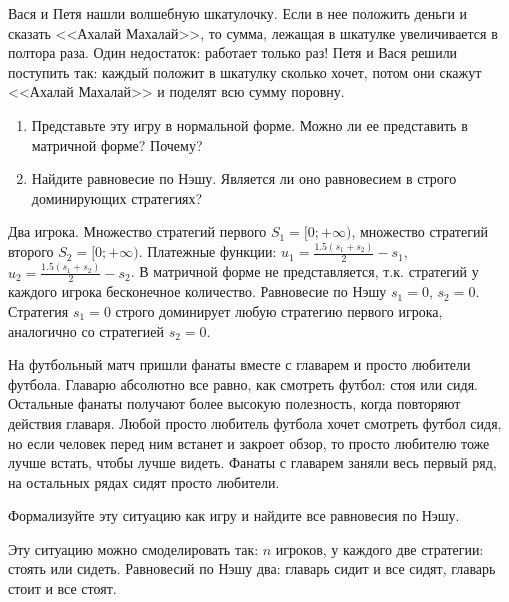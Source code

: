 \begin{problem}
Вася и Петя нашли волшебную шкатулочку. Если в нее положить деньги и сказать <<Ахалай Махалай>>, то сумма, лежащая в шкатулке увеличивается в полтора раза. Один недостаток: работает только раз! Петя и Вася решили поступить так: каждый положит в шкатулку сколько хочет, потом они скажут <<Ахалай Махалай>> и поделят всю сумму поровну.\par
\begin{enumerate}
\item 	Представьте эту игру в нормальной форме. Можно ли ее представить в матричной форме? Почему?\par
\item 	Найдите равновесие по Нэшу. Является ли оно равновесием в строго доминирующих стратегиях?
\end{enumerate}



\begin{sol}
Два игрока. Множество стратегий первого $S_{1}=[0;+\infty)$, множество стратегий второго $S_{2}=[0;+\infty)$. Платежные функции: $u_{1}=\frac{1.5(s_{1}+s_{2})}{2}-s_{1}$,  $u_{2}=\frac{1.5(s_{1}+s_{2})}{2}-s_{2}$. В матричной форме не представляется, т.к. стратегий у каждого игрока бесконечное количество. Равновесие по Нэшу $s_{1}=0$, $s_{2}=0$. Стратегия $s_{1}=0$ строго доминирует любую стратегию первого игрока, аналогично со стратегией $s_{2}=0$.
\end{sol}
\end{problem}

\begin{problem}
На футбольный матч пришли фанаты вместе с главарем и просто любители футбола. Главарю абсолютно все равно, как смотреть футбол: стоя или сидя. Остальные фанаты получают более высокую полезность, когда повторяют действия главаря. Любой просто любитель футбола хочет смотреть футбол сидя, но если человек перед ним встанет и закроет обзор, то просто любителю тоже лучше встать, чтобы лучше видеть. Фанаты с главарем заняли весь первый ряд, на остальных рядах сидят просто любители.\par

Формализуйте эту ситуацию как игру и найдите все равновесия по Нэшу.

\begin{sol}
Эту ситуацию можно смоделировать так: $n$ игроков, у каждого две стратегии: стоять или сидеть. Равновесий по Нэшу два: главарь сидит и все сидят, главарь стоит и все стоят.
\end{sol}
\end{problem}



